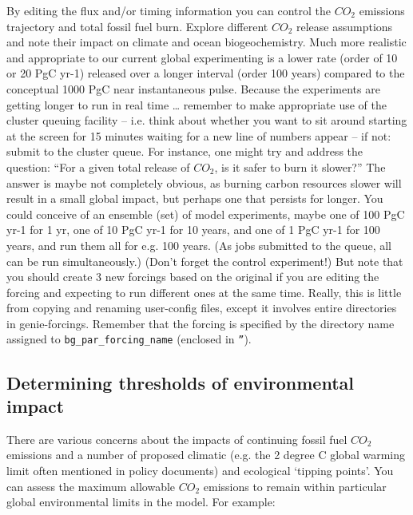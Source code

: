 \documentclass[11pt,fleqn]{book} %
\begin{document}
By editing the flux and/or timing information you can control the \(CO_{2}\) emissions trajectory and total fossil fuel burn. Explore different \(CO_{2}\) release assumptions and note their impact on climate and ocean biogeochemistry. Much more realistic and appropriate to our current global experimenting is a lower rate (order of 10 or 20 PgC yr-1) released over a longer interval (order 100 years) compared to the conceptual 1000 PgC near instantaneous pulse. Because the experiments are getting longer to run in real time … remember to make appropriate use of the cluster queuing facility – i.e. think about whether you want to sit around starting at the screen for 15 minutes waiting for a new line of numbers appear – if not: submit to the cluster queue. For instance, one might try and address the question: “For a given total release of \(CO_{2}\), is it safer to burn it slower?” The answer is maybe not completely obvious, as burning carbon resources slower will result in a small global impact, but perhaps one that persists for longer. You could conceive of an ensemble (set) of model experiments, maybe one of 100 PgC yr-1 for 1 yr, one of 10 PgC yr-1 for 10 years, and one of 1 PgC yr-1 for 100 years, and run them all for e.g. 100 years. (As jobs submitted to the queue, all can be run simultaneously.) (Don’t forget the control experiment!) But note that you should create 3 new forcings based on the original if you are editing the forcing and expecting to run different ones at the same time. Really, this is little from copying and renaming user-config files, except it involves entire directories in genie-forcings. Remember that the forcing is specified by the directory name assigned to \texttt{bg\_par\_forcing\_name} (enclosed in \texttt{''}).


\subsection{Determining thresholds of environmental impact}

There are various concerns about the impacts of continuing fossil fuel \(CO_{2}\) emissions and a number of proposed climatic (e.g. the 2 degree C global warming limit often mentioned in policy documents) and ecological ‘tipping points’. You can assess the maximum allowable \(CO_{2}\) emissions to remain within particular global environmental limits in the model. For example:
\end{document}
